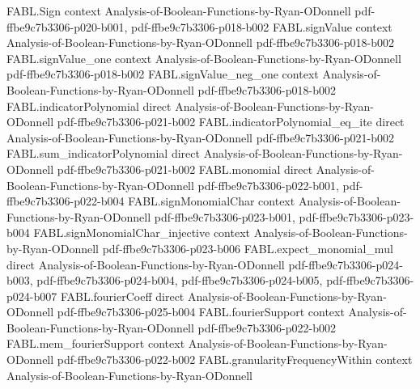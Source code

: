 \begin{theorem}
\label{FABL.noiseSensitivity_parityFunction}
\leanok
{}
\proofstep
  {FABL.Sign}
  {context}
  {Analysis-of-Boolean-Functions-by-Ryan-ODonnell}
  {pdf-ffbe9c7b3306-p020-b001,
    pdf-ffbe9c7b3306-p018-b002}
\proofstep
  {FABL.signValue}
  {context}
  {Analysis-of-Boolean-Functions-by-Ryan-ODonnell}
  {pdf-ffbe9c7b3306-p018-b002}
\proofstep
  {FABL.signValue_one}
  {context}
  {Analysis-of-Boolean-Functions-by-Ryan-ODonnell}
  {pdf-ffbe9c7b3306-p018-b002}
\proofstep
  {FABL.signValue_neg_one}
  {context}
  {Analysis-of-Boolean-Functions-by-Ryan-ODonnell}
  {pdf-ffbe9c7b3306-p018-b002}
\proofstep
  {FABL.indicatorPolynomial}
  {direct}
  {Analysis-of-Boolean-Functions-by-Ryan-ODonnell}
  {pdf-ffbe9c7b3306-p021-b002}
\proofstep
  {FABL.indicatorPolynomial_eq_ite}
  {direct}
  {Analysis-of-Boolean-Functions-by-Ryan-ODonnell}
  {pdf-ffbe9c7b3306-p021-b002}
\proofstep
  {FABL.sum_indicatorPolynomial}
  {direct}
  {Analysis-of-Boolean-Functions-by-Ryan-ODonnell}
  {pdf-ffbe9c7b3306-p021-b002}
\proofstep
  {FABL.monomial}
  {direct}
  {Analysis-of-Boolean-Functions-by-Ryan-ODonnell}
  {pdf-ffbe9c7b3306-p022-b001,
    pdf-ffbe9c7b3306-p022-b004}
\proofstep
  {FABL.signMonomialChar}
  {context}
  {Analysis-of-Boolean-Functions-by-Ryan-ODonnell}
  {pdf-ffbe9c7b3306-p023-b001,
    pdf-ffbe9c7b3306-p023-b004}
\proofstep
  {FABL.signMonomialChar_injective}
  {context}
  {Analysis-of-Boolean-Functions-by-Ryan-ODonnell}
  {pdf-ffbe9c7b3306-p023-b006}
\proofstep
  {FABL.expect_monomial_mul}
  {direct}
  {Analysis-of-Boolean-Functions-by-Ryan-ODonnell}
  {pdf-ffbe9c7b3306-p024-b003,
    pdf-ffbe9c7b3306-p024-b004,
    pdf-ffbe9c7b3306-p024-b005,
    pdf-ffbe9c7b3306-p024-b007}
\proofstep
  {FABL.fourierCoeff}
  {direct}
  {Analysis-of-Boolean-Functions-by-Ryan-ODonnell}
  {pdf-ffbe9c7b3306-p025-b004}
\proofstep
  {FABL.fourierSupport}
  {context}
  {Analysis-of-Boolean-Functions-by-Ryan-ODonnell}
  {pdf-ffbe9c7b3306-p022-b002}
\proofstep
  {FABL.mem_fourierSupport}
  {context}
  {Analysis-of-Boolean-Functions-by-Ryan-ODonnell}
  {pdf-ffbe9c7b3306-p022-b002}
\proofstep
  {FABL.granularityFrequencyWithin}
  {context}
  {Analysis-of-Boolean-Functions-by-Ryan-ODonnell}

\end{theorem}
